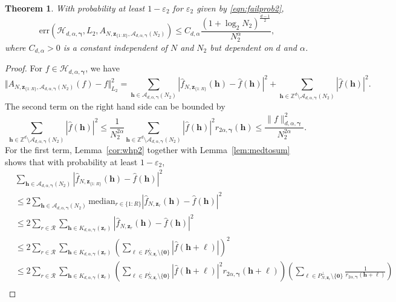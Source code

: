 \documentclass[a4paper,11pt]{article}
\newtheorem{theorem}{Theorem}[section]
\newcommand{\bszero}{\boldsymbol{0}}
\newcommand{\bsh}{\boldsymbol{h}}
\newcommand{\bsl}{\boldsymbol{\ell}}
\newcommand{\bsz}{\boldsymbol{z}}
\newcommand{\bsgamma}{\boldsymbol{\gamma}}
\newcommand{\ZZ}{\mathbb{Z}}
\newcommand{\Acal}{\mathcal{A}}
\newcommand{\Hcal}{\mathcal{H}}
\newcommand{\abs}[1]{\left\vert#1\right\vert}
\begin{document}
\begin{theorem}\label{thm:2}
With probability at least $1-\varepsilon_2$ for $\varepsilon_2$ given by \eqref{eqn:failprob2},
$$    \mathrm{err}(\Hcal_{d,\alpha,\bsgamma}, L_2,  A_{N,\bsz_{\{1{:}R\}},\Acal_{d,\alpha,\bsgamma}(N_2)}) \leq     C_{d, \alpha}  \frac{ (1+\log_2 N_2)^{\frac{d-1}{2}}}{N_2^{ \alpha}}, $$ where $C_{d, \alpha} > 0$ is a constant independent of $N$ and $N_2$ but dependent on $d$ and $\alpha$.
\end{theorem}

\begin{proof}
     For $f\in \Hcal_{d,\alpha,\bsgamma}$, we have
    \begin{equation}\label{eqn:L2errordecomp}
         \Vert A_{N,\bsz_{\{1{:}R\}},\Acal_{d,\alpha,\bsgamma}(N_2)}(f)-f\Vert^2_{L_2} = \sum_{\bsh\in \Acal_{d,\alpha,\bsgamma}(N_2)} \abs{\widehat{f}_{N,\bsz_{\{1{:}R\}}}(\bsh)-\widehat{f}({\bsh})}^2+\sum_{\bsh\in \ZZ^d\setminus\Acal_{d,\alpha,\bsgamma}(N_2)} \abs{\widehat{f}({\bsh})}^2.
    \end{equation}
    The second term on the right hand side can be bounded by
    \begin{equation*}
        \sum_{\bsh\in \ZZ^d\setminus\Acal_{d,\alpha,\bsgamma}(N_2)} \abs{\widehat{f}({\bsh})}^2\leq \frac{1}{N^{2\alpha}_2}\sum_{\bsh\in \ZZ^d\setminus\Acal_{d,\alpha,\bsgamma}(N_2)} \abs{\widehat{f}({\bsh})}^2r_{2\alpha,\bsgamma}(\bsh)\leq  \frac{\|f\|^2_{d,\alpha,\bsgamma}}{N^{2\alpha}_2}.
    \end{equation*}
    For the first term, Lemma~\ref{cor:whp2} together with Lemma~\ref{lem:medtosum} shows that with probability at least $1-\varepsilon_2$, 
        \begin{align*}
         & \sum_{\bsh\in \Acal_{d,\alpha,\bsgamma}(N_2)} \abs{\widehat{f}_{N,\bsz_{\{1{:}R\}}}(\bsh)-\widehat{f}({\bsh})}^2 \\
         & \leq 2\sum_{\bsh\in \Acal_{d,\alpha,\bsgamma}(N_2)}  \mathrm{median}_{r\in\{1{:}R\}} \abs{\widehat{f}_{N,\bsz_r}(\bsh)-\widehat{f}({\bsh})}^2 \\
         & \leq 2 \sum_{r\in\mathcal{R}} \sum_{\bsh\in K_{d,\alpha,\bsgamma}(\bsz_r)} \abs{\widehat{f}_{N,\bsz_r}(\bsh)-\widehat{f}({\bsh})}^2\\
         & \leq 2  \sum_{r\in\mathcal{R}} \sum_{\bsh\in K_{d,\alpha,\bsgamma}(\bsz_r)} \left(\sum_{\bsl\in P^\perp_{N,\bsz_r}\setminus\{\bszero\} } \abs{\widehat{f}({\bsh+\bsl})}\right)^2 \\
         & \leq 2  \sum_{r\in\mathcal{R}} \sum_{\bsh\in K_{d,\alpha,\bsgamma}(\bsz_r)} \left(\sum_{\bsl\in P^\perp_{N,\bsz_r}\setminus\{\bszero\} } \abs{\widehat{f}({\bsh+\bsl})}^2 r_{2\alpha,\bsgamma}(\bsh+\bsl) \right) \left(\sum_{\bsl\in P^\perp_{N,\bsz_r}\setminus\{\bszero\} }\frac{1}{r_{2\alpha,\bsgamma}(\bsh+\bsl)} \right)\\

\end{align*}
\end{proof}
\end{document}
